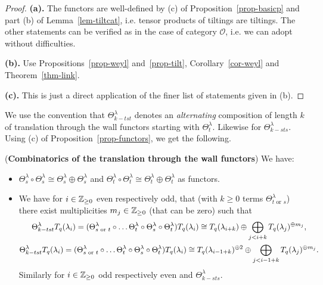 \begin{proof}
\textbf{(a).} The functors are well-defined by 
(c) of Proposition~\ref{prop-basicp} and
part (b) of Lemma~\ref{lem-tiltcat}, i.e. tensor products of tiltings are tiltings. 
The other statements can be verified as in the 
case of category $\mathcal O$, i.e. we can adopt~\cite[Sections~7.1 and~7.2]{hum} without difficulties. 




\textbf{(b).} Use 
Propositions~\ref{prop-weyl} 
and~\ref{prop-tilt}, Corollary~\ref{cor-weyl} and Theorem~\ref{thm-link}.



\textbf{(c).} This is just a direct application of the finer list of 
statements given in (b).
\end{proof}



We use the convention that 
$\Theta^{\lambda}_{k-tst}$ denotes an 
\textit{alternating} composition of length 
$k$ of translation through the wall functors starting with 
$\Theta^{\lambda}_{t}$. Likewise for $\Theta^{\lambda}_{k-sts}$.
Using (c) of Proposition~\ref{prop-functors}, we get the following.


\begin{cor}(\textbf{Combinatorics of the translation 
through the wall functors})\label{cor-theta}
We have:
\begin{itemize}
\item[(a)] $\Theta_s^{\lambda}\circ\Theta_s^{\lambda}\cong \Theta_s^{\lambda}\oplus \Theta_s^{\lambda}$ and $\Theta_t^{\lambda}\circ\Theta_t^{\lambda}\cong \Theta_t^{\lambda}\oplus \Theta_t^{\lambda}$ as functors.
\item[(b)] We have for $i\in\mathbb{Z}_{\geq 0}$ even respectively odd, 
that (with $k\geq 0$ terms $\Theta^{\lambda}_{t\text{ or }s}$) 
there exist multiplicities $m_j\in\mathbb{Z}_{\geq 0}$ (that can be zero) such that
\begin{gather*}
\Theta^{\lambda}_{k-tst}T_q({\lambda_i})=(\Theta^{\lambda}_{s\text{ or }t}\circ\dots\Theta^{\lambda}_t\circ\Theta^{\lambda}_s\circ\Theta^{\lambda}_t)T_q({\lambda_i})\cong T_q({\lambda_{i+k}})\oplus \bigoplus_{j<i+k}T_q({\lambda_{j}})^{\oplus m_j},
\\
\Theta^{\lambda}_{k-tst}T_q({\lambda_i})=(\Theta^{\lambda}_{s\text{ or }t}\circ\dots\Theta^{\lambda}_t\circ\Theta^{\lambda}_s\circ\Theta^{\lambda}_t)T_q({\lambda_i})\cong T_q({\lambda_{i-1+k}})^{\oplus 2}\oplus \bigoplus_{j<i-1+k}T_q({\lambda_{j}})^{\oplus m_j}.
\end{gather*}
Similarly for $i\in\mathbb{Z}_{\geq 0}$ odd respectively even and $\Theta^{\lambda}_{k-sts}$.\makeqed
\end{itemize}
\end{cor}

